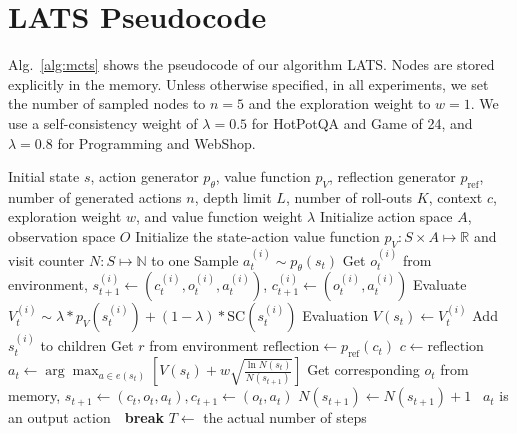 \section{LATS Pseudocode}
\label{sec:pseudocode}
Alg.~\ref{alg:mcts} shows the pseudocode of our algorithm LATS. Nodes are stored explicitly in the memory. Unless otherwise specified, in all experiments, we set the number of sampled nodes to $n=5$ and the exploration weight to $w=1$. We use a self-consistency weight of $\lambda=0.5$ for HotPotQA and Game of 24, and $\lambda=0.8$ for Programming and WebShop.
\begin{algorithm*}[ht]
\centering
\caption{$\operatorname{LATS}(s, p_\theta, {p_V}, p_{\text{ref}}, d, k, n, w, a, b)$ \label{alg:mcts}}
\begin{minipage}{0.9\linewidth} 
\small
\begin{algorithmic}
    \Require Initial state $s$, action generator $p_\theta$, value function {$p_V$}, reflection generator $p_{\text{ref}}$, number of generated actions $n$, depth limit $L$, number of roll-outs $K$, context $c$, exploration weight $w$, and value function weight $\lambda$
    \State Initialize action space $A$, observation space $O$
    \State Initialize the state-action value function ${p_V} : S \times A \mapsto \mathbb R$ and visit counter ${N} : S \mapsto \mathbb N$ to one
             
                \State Sample $a_t^{(i)} \sim p_\theta(s_t)$
                \State Get $o_t^{(i)}$ from environment, $s_{t+1}^{(i)} \gets (c_{t}^{(i)}, o_t^{(i)}, a_t^{(i)})$, $c_{t+1}^{(i)} \gets (o_t^{(i)}, a_t^{(i)})$
                \State Evaluate ${V}_t^{(i)} \sim \lambda * {p_V}(s_t^{(i)}) + (1-\lambda) * \text{SC}(s_t^{(i)})$ 
                \Comment Evaluation
                \State ${V}(s_t) \gets {V}_t^{(i)}$
                \State Add $s_t^{(i)}$ to children
                \EndFor
            \EndIf
                \State Get $r$ from environment
                    \State $\text{reflection} \gets p_{\text{ref}}(c_t)$
                    \State $c \gets \text{reflection}$
                \EndIf
            \EndIf
            \State $a_{t} \gets \arg\max_{a \in e(s_t)} \left[ {V(s_t)} + w \sqrt{\frac{\ln {N}(s_{t})}{{N}(s_{t+1})}} \right]$ 
            \State Get corresponding $o_t$ from memory, $s_{t+1} \gets (c_t,o_t,a_t), c_{t+1}\gets (o_t,a_t)$
            \State ${N}(s_{t+1}) \gets {N}(s_{t+1}) + 1$
            \State \algorithmicif\ {$a_t$ is an output action}\ \algorithmicthen\ \textbf{break}
        \EndFor
        \State $T \gets$ the actual number of steps
         
        \EndFor
    \EndFor
\end{algorithmic}
\end{minipage}
\end{algorithm*}

